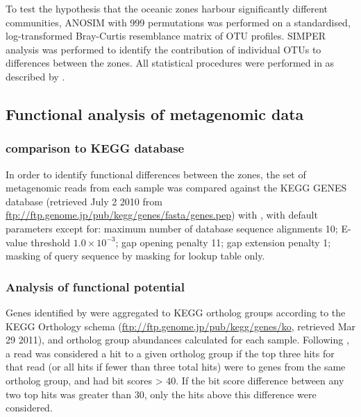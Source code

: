 To test the hypothesis that the oceanic zones harbour significantly different communities, \ac{ANOSIM} with 999 permutations was performed on a standardised, log-transformed Bray-Curtis resemblance matrix of \ac{OTU} profiles.
\ac{SIMPER} analysis was performed to identify the contribution of individual \acp{OTU} to differences between the zones. 
All statistical procedures were performed in  as described by \citet{Clarke:2001ut}.

\subsection{Functional analysis of metagenomic data}

\subsubsection{ comparison to \ac{KEGG} database}

In order to identify functional differences between the zones, the set of metagenomic reads from each sample was compared against the \ac{KEGG} GENES database (retrieved July 2 2010 from \url{ftp://ftp.genome.jp/pub/kegg/genes/fasta/genes.pep}) with , with default parameters except for: maximum number of database sequence alignments 10; E-value threshold $1.0\times10^{-3}$; gap opening penalty 11; gap extension penalty 1; masking of query sequence by  masking for lookup table only.

\subsubsection{Analysis of functional potential}

Genes identified by  were aggregated to \ac{KEGG} ortholog groups according to the \ac{KEGG} Orthology schema (\url{ftp://ftp.genome.jp/pub/kegg/genes/ko}, retrieved Mar 29 2011), and ortholog group abundances calculated for each sample. 
Following \citet{Coleman:2010jj}, a read was considered a hit to a given ortholog group if the top three hits for that read (or all hits if fewer than three total hits) were to genes from the same ortholog group, and had bit scores \textgreater{} 40. 
If the bit score difference between any two top hits was greater than 30, only the hits above this difference were considered.


